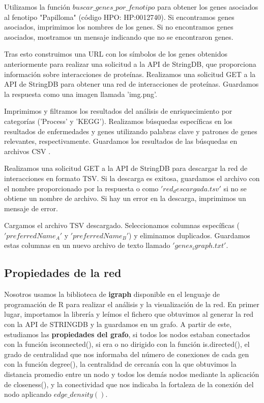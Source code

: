 Utilizamos la función $buscar\_genes\_por\_fenotipo$ para obtener los genes asociados al fenotipo "Papilloma" (código HPO: HP:0012740).
Si encontramos genes asociados, imprimimos los nombres de los genes. Si no encontramos genes asociados, mostramos un mensaje indicando que no se encontraron genes.

Tras esto construimos una URL con los símbolos de los genes obtenidos anteriormente para realizar una solicitud a la API de StringDB, que proporciona información sobre interacciones de proteínas.
Realizamos una solicitud GET a la API de StringDB para obtener una red de interacciones de proteínas.
Guardamos la respuesta como una imagen llamada 'img.png'.

Imprimimos y filtramos los resultados del análisis de enriquecimiento por categorías ('Process' y 'KEGG').
Realizamos búsquedas específicas en los resultados de enfermedades y genes utilizando palabras clave y patrones de genes relevantes, respectivamente.
Guardamos los resultados de las búsquedas en archivos CSV .

Realizamos una solicitud GET a la API de StringDB para descargar la red de interacciones en formato TSV.
Si la descarga es exitosa, guardamos el archivo con el nombre proporcionado por la respuesta o como $'red_descargada.tsv'$ si no se obtiene un nombre de archivo.
Si hay un error en la descarga, imprimimos un mensaje de error.

Cargamos el archivo TSV descargado.
Seleccionamos columnas específicas ($'preferredName_A'$ y $'preferredName_B'$) y eliminamos duplicados.
Guardamos estas columnas en un nuevo archivo de texto llamado $'genes_igraph.txt'$.

\subsection{Propiedades de la red}

Nosotros usamos la biblioteca de \textbf{igraph} disponible en el lenguaje de programación de R para realizar el análisis y la visualización de la red. En primer lugar, importamos la librería y leímos el fichero que obtuvimos al generar la red con la API de STRINGDB y la guardamos en un grafo. A partir de este, estudiamos las \textbf{propiedades del grafo}, si todos los nodos estaban conectados con la función isconnected(), si era o no dirigido con la función is.directed(), el grado de centralidad que nos informaba del número de conexiones de cada gen con la función degree(), la centralidad de cercanía con la que obtuvimos la distancia promedio entre un nodo y todos los demás nodos mediante la aplicación de closeness(), y la conectividad que nos indicaba la fortaleza de la conexión del nodo aplicando $edge\_density()$. 

